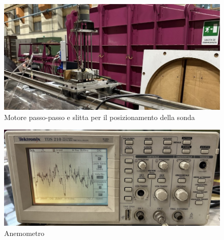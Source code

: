 \begin{figure}[H]
    \centering
    \includegraphics[width=\textwidth]{images/9/passopasso.jpg}
    \caption{Motore passo-passo e slitta per il posizionamento della sonda}
\end{figure}
\begin{figure}[H]
    \centering
    \includegraphics[width=\textwidth]{images/9/anem1.jpg}
    \caption{Anemometro}
\end{figure}

\newpage

